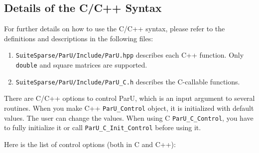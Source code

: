 \documentclass[12pt]{article}
\begin{document}
\subsection{Details of the C/C++ Syntax}

For further details on how to use the C/C++ syntax, please refer to the
definitions and descriptions in the following files:

\begin{enumerate}
\item \verb'SuiteSparse/ParU/Include/ParU.hpp' describes each
C++ function.  Only \verb'double' and square matrices are supported.


\item \verb'SuiteSparse/ParU/Include/ParU_C.h' describes
the C-callable functions.

\end{enumerate}

There are C/C++ options to control ParU, which is an input argument to several 
routines. When you make C++ \verb'ParU_Control' object, it is initialized with 
default values. The user can change the values. When using C  
\verb'ParU_C_Control', you have to fully initialize it or call
\verb'ParU_C_Init_Control' before using it.


Here is the list of control options (both in C and C++):
\end{document}
